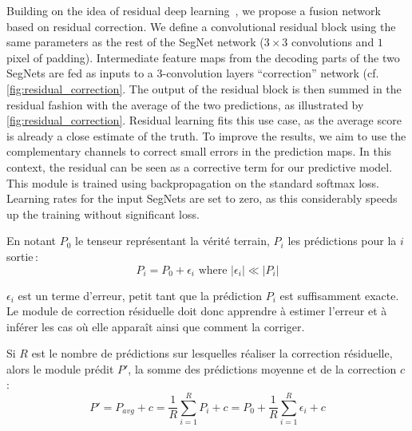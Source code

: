 Building on the idea of residual deep learning~\cite{he_deep_2016}, we propose a fusion network based on residual correction. We define a convolutional residual block using the same parameters as the rest of the SegNet network ($3\times3$ convolutions and $1$ pixel of padding). Intermediate feature maps from the decoding parts of the two SegNets are fed as inputs to a 3-convolution layers ``correction'' network (cf. \cref{fig:residual_correction}. The output of the residual block is then summed in the residual fashion with the average of the two predictions, as illustrated by \cref{fig:residual_correction}. Residual learning fits this use case, as the average score is already a close estimate of the truth. To improve the results, we aim to use the complementary channels to correct small errors in the prediction maps. In this context, the residual can be seen as a corrective term for our predictive model. This module is trained using backpropagation on the standard softmax loss. Learning rates for the input SegNets are set to zero, as this considerably speeds up the training without significant loss.



En notant $P_0$ le tenseur représentant la vérité terrain, $P_i$ les prédictions pour la $i$\ieme sortie\,:
\begin{equation}
P_i = P_0 + \epsilon_i \text{ where } \lvert \epsilon_i \lvert  \ll \rvert P_i \rvert
\end{equation}

$\epsilon_i$ est un terme d'erreur, petit tant que la prédiction $P_i$ est suffisamment exacte. Le module de correction résiduelle doit donc apprendre à estimer l'erreur et à inférer les cas où elle apparaît ainsi que comment la corriger.

Si $R$ est le nombre de prédictions sur lesquelles réaliser la correction résiduelle, alors le module prédit $P'$, la somme des prédictions moyenne et de la correction $c$ :
\begin{equation}
P' = P_{avg} + c = \frac{1}{R} \sum_{i=1}^R P_i + c = P_0 + \frac{1}{R} \sum_{i=1}^R \epsilon_i + c
\end{equation}

